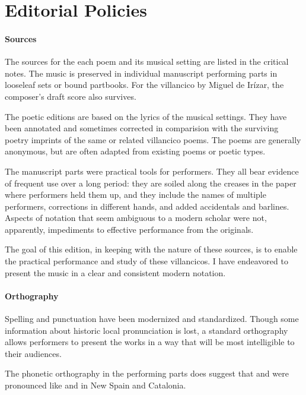 \section*{Editorial Policies}

\paragraph{Sources}

The sources for the each poem and its musical setting are listed in the 
critical notes.
The music is preserved in individual manuscript performing parts in looseleaf 
sets or bound partbooks.
For the villancico by Miguel de Irízar, the composer's draft score also 
survives.

The poetic editions are based on the lyrics of the musical settings.
They have been annotated and sometimes corrected in comparision with the 
surviving poetry imprints of the same or related villancico poems.
The poems are generally anonymous, but are often adapted from existing poems or 
poetic types.

The manuscript parts were practical tools for performers.
They all bear evidence of frequent use over a long period: they are soiled 
along the creases in the paper where performers held them up, and they include 
the names of multiple performers, corrections in different hands, and added 
accidentals and barlines.
Aspects of notation that seem ambiguous to a modern scholar were not, 
apparently, impediments to effective performance from the originals.

The goal of this edition, in keeping with the nature of these sources, is to 
enable the practical performance and study of these villancicos.
I have endeavored to present the music in a clear and consistent modern 
notation.


\paragraph{Orthography}
Spelling and punctuation have been modernized and standardized.
Though some information about historic local pronunciation is lost, a standard 
orthography allows performers to present the works in a way that will be most 
intelligible to their audiences.%
  \begin{Footnote}
      The phonetic orthography in the performing parts does suggest that 
       and  were pronounced like  and 
       in New Spain and Catalonia.
  \end{Footnote}

